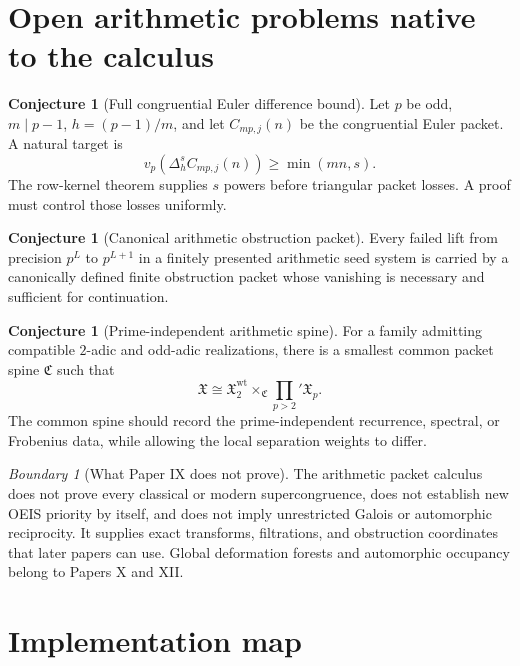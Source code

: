 \documentclass[11pt]{article}
\theoremstyle{definition}
\newtheorem{conjecture}[theorem]{Conjecture}
\theoremstyle{remark}
\newtheorem{boundary}[theorem]{Boundary}
\newcommand{\cX}{\mathfrak X}
\begin{document}
\section{Open arithmetic problems native to the calculus}

\begin{conjecture}[Full congruential Euler difference bound]
Let $p$ be odd, $m\mid p-1$, $h=(p-1)/m$, and let $C_{mp,j}(n)$ be the congruential Euler packet. A natural target is
\[
\boxed{
 v_p\left(\Delta_h^sC_{mp,j}(n)\right)
 \ge
 \min(mn,s).
}
\]
The row-kernel theorem supplies $s$ powers before triangular packet losses. A proof must control those losses uniformly.
\end{conjecture}

\begin{conjecture}[Canonical arithmetic obstruction packet]
Every failed lift from precision $p^L$ to $p^{L+1}$ in a finitely presented arithmetic seed system is carried by a canonically defined finite obstruction packet whose vanishing is necessary and sufficient for continuation.
\end{conjecture}

\begin{conjecture}[Prime-independent arithmetic spine]
For a family admitting compatible $2$-adic and odd-adic realizations, there is a smallest common packet spine $\mathfrak C$ such that
\[
\cX
\cong
\cX_2^{\mathrm{wt}}
\times_{\mathfrak C}
\prod_{p>2}'\cX_p.
\]
The common spine should record the prime-independent recurrence, spectral, or Frobenius data, while allowing the local separation weights to differ.
\end{conjecture}

\begin{boundary}[What Paper IX does not prove]
The arithmetic packet calculus does not prove every classical or modern supercongruence, does not establish new OEIS priority by itself, and does not imply unrestricted Galois or automorphic reciprocity. It supplies exact transforms, filtrations, and obstruction coordinates that later papers can use. Global deformation forests and automorphic occupancy belong to Papers X and XII.
\end{boundary}

\section{Implementation map}
\end{document}

